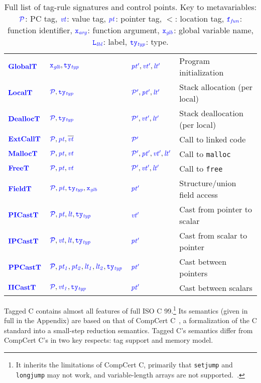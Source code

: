 \documentclass{llncs}
\begin{document}
\begin{table}[t]
\begin{tabular}{|l|l|l|l|}
    \(\globaltname\)    & \(\globaltargs\)       & \(\globaltres\)    & Program initialization \\
    \(\localtname\)     & \(\localtargs\)        & \(\localtres\)     & Stack allocation (per local) \\
    \(\dealloctname\)   & \(\dealloctargs\)      & \(\dealloctres\)   & Stack deallocation (per local) \\
    \(\extcalltname\)   & \(\extcalltargs\)      & \(\extcalltres\)   & Call to linked code \\
    \(\malloctname\)    & \(\malloctargs\)       & \(\malloctres\)    & Call to {\tt malloc} \\
    \(\freetname\)      & \(\freetargs\)         & \(\freetres\)      & Call to {\tt free} \\
    \(\fieldtname\)     & \(\fieldtargs\)        & \(\fieldtres\)     & Structure/union field access \\
    \(\picasttname\)    & \(\picasttargs\)       & \(\picasttres\)    & Cast from pointer to scalar \\
    \(\ipcasttname\)    & \(\ipcasttargs\)       & \(\ipcasttres\)    & Cast from scalar to pointer \\
    \(\ppcasttname\)    & \(\ppcasttargs\)       & \(\ppcasttres\)    & Cast between pointers \\
    \(\iicasttname\)    & \(\iicasttargs\)       & \(\iicasttres\)    & Cast between scalars \\
    \hline
  \end{tabular}

  \caption{Full list of tag-rule signatures and control points. Key to metavariables:
    \(\PCT\): PC tag, \(\vt\): value tag, \(\pt\): pointer tag, \(\lt\): location tag,
    \(\FN\): function identifier, \(\AN\): function argument, \(\GN\): global
    variable name, \(\LN\): label, \(\TN\): type.}
  \label{fig:controlpoints}
\end{table}

Tagged C contains almost all features of full ISO C 99.\footnote{
It inherits the limitations of CompCert C, primarily that {\tt setjump} and {\tt longjump}
may not work, and variable-length arrays are not supported.~\cite[Ch. 5]{Leroy22:CompCertManual}.}
Its semantics (given in full in the Appendix)
are based on that of CompCert C~\cite{Leroy09:CompCert},
a formalization of the C standard into a small-step reduction semantics.
Tagged C's semantics differ from CompCert C's in two key respects: tag support and memory model.
\end{document}
